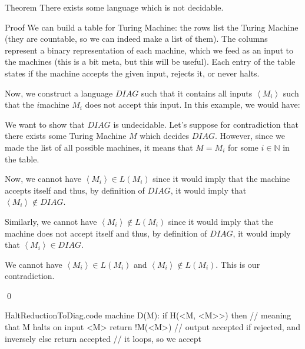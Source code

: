 \documentclass[a4paper]{article}
\begin{document}
\begin{parag}{Theorem}
    There exists some language which is not decidable.

    \begin{subparag}{Proof}
        We can build a table for Turing Machine: the rows list the Turing Machine (they are countable, so we can indeed make a list of them). The columns represent a binary representation of each machine, which we feed as an input to the machines (this is a bit meta, but this will be useful). Each entry of the table states if the machine accepts the given input, rejects it, or never halts.

        Now, we construct a language $DIAG$ such that it contains all inputs $\left\langle M_i \right\rangle$ such that the $i$\Th machine $M_i$ does not accept this input. In this example, we would have: 
        
        We want to show that $DIAG$ is undecidable. Let's suppose for contradiction that there exists some Turing Machine $M$ which decides $DIAG$. However, since we made the list of all possible machines, it means that $M = M_i$ for some $i \in \mathbb{N}$ in the table.

        Now, we cannot have $\left\langle M_i \right\rangle \in L\left(M_i\right)$ since it would imply that the machine accepts itself and thus, by definition of $DIAG$, it would imply that $\left\langle M_i \right\rangle \not \in DIAG$.

        Similarly, we cannot have $\left\langle M_i \right\rangle \not \in L\left(M_i\right)$ since it would imply that the machine does not accept itself and thus, by definition of $DIAG$, it would imply that $\left\langle M_i \right\rangle \in DIAG$.

        We cannot have $\left\langle M_i \right\rangle \in L\left(M_i\right)$ and $\left\langle M_i \right\rangle \not \in L\left(M_i\right)$. This is our contradiction.

        \qed
    \end{subparag}
\end{parag}

\begin{filecontents*}[overwrite]{HaltReductionToDiag.code}
machine D(M):
    if H(<M, <M>>) then  // meaning that M halts on input <M>
        return !M(<M>)  // output accepted if rejected, and inversely
    else
        return accepted  // it loops, so we accept
\end{filecontents*}
\end{document}
